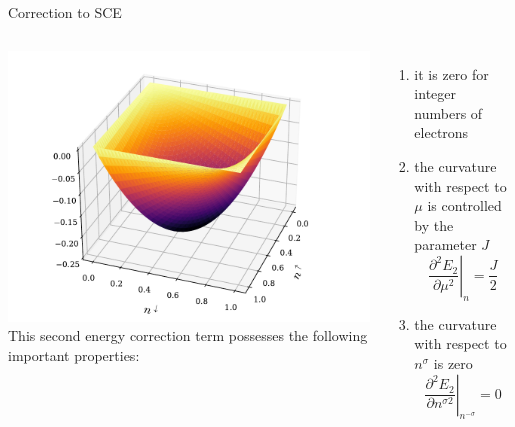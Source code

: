 \documentclass[xcolor=table,aspectratio=169]{beamer}
\numberwithin{equation}{section}
\begin{document}
\begin{frame}{Correction to SCE}
    \begin{columns}
        \centering
        \includegraphics[width=1.2\columnwidth]{figures/novel_k_correction.pdf}
        \footnotesize
        This second energy correction term possesses the following important properties:
        \begin{enumerate}
            \item it is zero for integer numbers of electrons
            \item the curvature with respect to $\mu$ is controlled by the parameter $J$
                  \begin{equation*}
                      \left.\frac{\partial^2 E_2}{\partial \mu^{2}}\right|_{n} = \frac{J}{2}
                  \end{equation*}
            \item the curvature with respect to $n^\sigma$ is zero
                  \begin{equation*}
                      \left.\frac{\partial^2 E_2}{\partial n^{\sigma 2}}\right|_{n^{-\sigma}} = 0
                  \end{equation*}
        \end{enumerate}
    \end{columns}
\end{frame}
\end{document}
